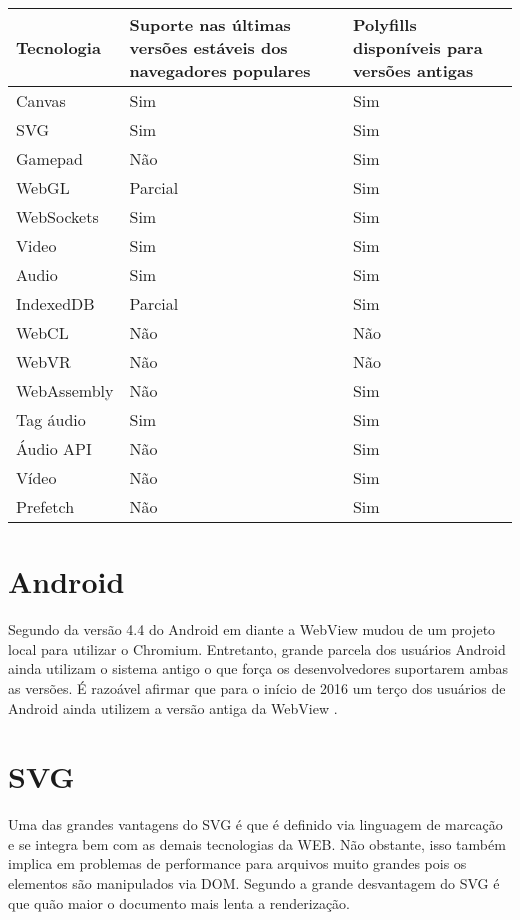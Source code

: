 \begin{tabular}{ |p{3cm}|p{3cm}|p{3cm}|  }
\hline
Tecnologia & Suporte nas últimas versões estáveis dos navegadores populares & Polyfills disponíveis  para versões antigas \\
\hline
Canvas & Sim & Sim \\
SVG & Sim & Sim \\
Gamepad & Não & Sim \\
WebGL & Parcial & Sim \\
WebSockets & Sim & Sim \\
Video & Sim & Sim \\
Audio & Sim & Sim \\
IndexedDB & Parcial & Sim \\
WebCL & Não & Não \\
WebVR & Não & Não \\
WebAssembly & Não & Sim \\
Tag áudio & Sim & Sim \\
Áudio API & Não & Sim \\
Vídeo & Não & Sim \\
Prefetch & Não & Sim \\
\hline
\end{tabular}

\section{Android}

Segundo \cite{chromeWebView} da versão 4.4 do Android em diante a
WebView mudou de um projeto local para utilizar o Chromium. Entretanto,
grande parcela dos usuários Android ainda utilizam o sistema antigo o
que força os desenvolvedores suportarem ambas as versões. É razoável
afirmar que para o início de 2016 um terço dos usuários de Android
ainda utilizem a versão antiga da WebView \cite{chromeWebView}.

\section{SVG}

Uma das grandes vantagens do SVG é que é definido via linguagem de
marcação e se integra bem com as demais tecnologias da WEB. Não
obstante, isso também implica em problemas de performance para arquivos
muito grandes pois os elementos são manipulados via DOM. Segundo
\cite{html5mostwanted} a grande desvantagem do SVG é que quão maior o
documento mais lenta a renderização.

